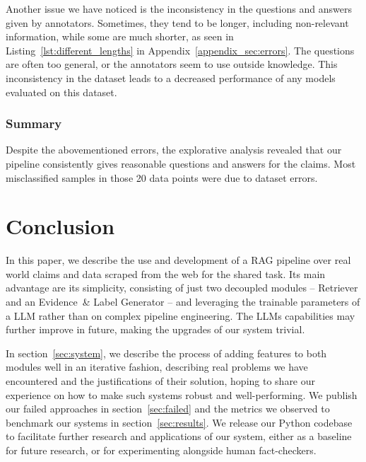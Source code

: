 Another issue we have noticed is the inconsistency in the questions and answers given by annotators. {Sometimes, they tend to be longer, including non-relevant information, while some are much shorter, as seen in Listing~\ref{lst:different_lengths} in Appendix~\ref{appendix_sec:errors}}. The questions are often too general, or the annotators seem to use outside knowledge. This inconsistency in the dataset leads to a decreased performance of any models evaluated on this dataset.

\subsubsection{Summary}
Despite the abovementioned errors, the explorative analysis revealed that our pipeline consistently gives reasonable questions and answers for the claims. Most misclassified samples in those 20 data points were due to dataset errors.


\section{Conclusion}
\label{sec:conclusion}
In this paper, we describe the use and development of a RAG pipeline over real world claims and data scraped from the web for the \averitec{} shared task.
Its main advantage are its simplicity, consisting of just two decoupled modules -- Retriever and an Evidence~\& Label Generator -- and leveraging the trainable parameters of a LLM rather than on complex pipeline engineering.
The LLMs capabilities may further improve in future, making the upgrades of our system trivial.

In section~\ref{sec:system}, we describe the process of adding features to both modules well in an iterative fashion, describing real problems we have encountered and the justifications of their solution, hoping to share our experience on how to make such systems robust and well-performing.
We publish our failed approaches in section~\ref{sec:failed} and the metrics we observed to benchmark our systems in section~\ref{sec:results}. 
We release our Python codebase to facilitate further research and applications of our system, either as a baseline for future research, or for experimenting alongside human fact-checkers.

